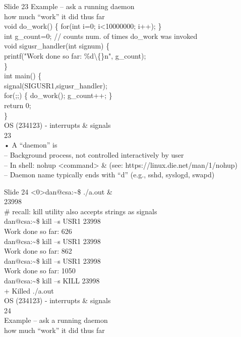 \documentclass{beamer}
\begin{document}
\begin{frame}{Slide 23}
Example – ask a running daemon \\how much “work” it did thus far\\void do\_work() \{ for(int i=0; i<10000000; i++); \}\\int g\_count=0; // counts num. of times do\_work was invoked\\void sigusr\_handler(int signum) \{\\    printf("Work done so far: \%d\textbackslash\{\}n", g\_count);\\\}\\int main() \{\\    signal(SIGUSR1,sigusr\_handler);\\    for(;;) \{ do\_work(); g\_count++; \}\\    return 0;\\\}\\OS (234123) - interrupts \& signals\\23\\• A “daemon” is\\– Background process, not controlled interactively by user\\– In shell: nohup <command> \& (see: https://linux.die.net/man/1/nohup)\\– Daemon name typically ends with “d” (e.g., sshd, syslogd, swapd)
\end{frame}
\begin{frame}{Slide 24}
<0>dan@csa:\textasciitilde{}\$ ./a.out \&\\[1] 23998\\\# recall: kill utility also accepts strings as signals\\<0>dan@csa:\textasciitilde{}\$ kill –s USR1 23998\\Work done so far: 626\\<0>dan@csa:\textasciitilde{}\$ kill –s USR1 23998\\Work done so far: 862\\<0>dan@csa:\textasciitilde{}\$ kill –s USR1 23998\\Work done so far: 1050\\<0>dan@csa:\textasciitilde{}\$ kill –s KILL 23998\\[1]+  Killed                  ./a.out\\OS (234123) - interrupts \& signals\\24\\Example – ask a running daemon \\how much “work” it did thus far
\end{frame}
\end{document}
